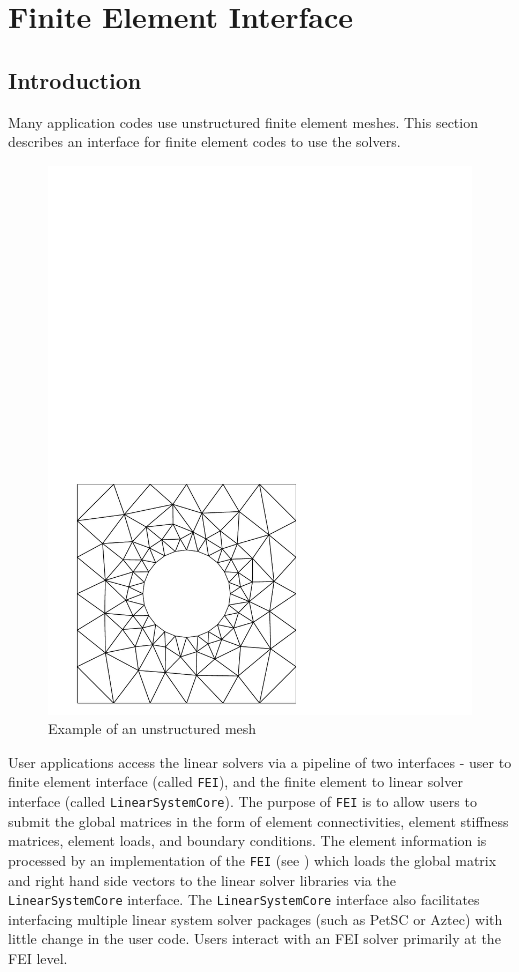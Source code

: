 \chapter{Finite Element Interface}
\label{ch-FEI}

\section{Introduction}

Many application codes use unstructured finite element meshes.
This section describes an interface for finite element codes 
to use the \hypre{} solvers.
\begin{figure}[htbp]
\centerline{\includegraphics[width=.3\textwidth]{square-hole.pdf}}
\caption{Example of an unstructured mesh}
\end{figure}

User applications access the \hypre{} linear solvers via a pipeline of
two interfaces - user to finite element interface (called {\tt FEI}),
and the finite element to linear solver interface (called 
{\tt LinearSystemCore}). The purpose of {\tt FEI} is to allow users 
to submit the global matrices in the form of element connectivities, 
element stiffness matrices, element loads, and boundary conditions. 
The element information is processed by an implementation of the 
{\tt FEI} (see \cite{FEI-ref}) which loads the global matrix and right
hand side vectors to the linear solver libraries via the 
{\tt LinearSystemCore} interface.
The {\tt LinearSystemCore} interface also facilitates interfacing 
multiple linear system solver packages (such as PetSC or Aztec)
with little change in the user code. Users interact with an FEI
solver primarily at the FEI level.

